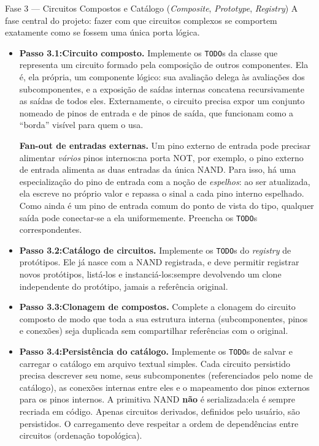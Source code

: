 \documentclass[11pt,a4paper]{article}
\begin{document}
\begin{phasebox}{Fase 3 — Circuitos Compostos e Catálogo (\textit{Composite}, \textit{Prototype}, \textit{Registry})}{}
A fase central do projeto: fazer com que circuitos complexos se comportem exatamente como se fossem uma única porta lógica.

\begin{itemize}
    \item \textbf{Passo 3.1:Circuito composto.} Implemente os \texttt{TODO}s da classe que representa um circuito formado pela composição de outros componentes. Ela é, ela própria, um componente lógico: sua avaliação delega às avaliações dos subcomponentes, e a exposição de saídas internas concatena recursivamente as saídas de todos eles. Externamente, o circuito precisa expor um conjunto nomeado de pinos de entrada e de pinos de saída, que funcionam como a ``borda'' visível para quem o usa.

    \textbf{Fan-out de entradas externas.} Um pino externo de entrada pode precisar alimentar \emph{vários} pinos internos:na porta NOT, por exemplo, o pino externo de entrada alimenta as duas entradas da única NAND. Para isso, há uma especialização do pino de entrada com a noção de \emph{espelhos}: ao ser atualizada, ela escreve no próprio valor e repassa o sinal a cada pino interno espelhado. Como ainda é um pino de entrada comum do ponto de vista do tipo, qualquer saída pode conectar-se a ela uniformemente. Preencha os \texttt{TODO}s correspondentes.
    \item \textbf{Passo 3.2:Catálogo de circuitos.} Implemente os \texttt{TODO}s do \textit{registry} de protótipos. Ele já nasce com a NAND registrada, e deve permitir registrar novos protótipos, listá-los e instanciá-los:sempre devolvendo um clone independente do protótipo, jamais a referência original.
    \item \textbf{Passo 3.3:Clonagem de compostos.} Complete a clonagem do circuito composto de modo que toda a sua estrutura interna (subcomponentes, pinos e conexões) seja duplicada sem compartilhar referências com o original.
    \item \textbf{Passo 3.4:Persistência do catálogo.} Implemente os \texttt{TODO}s de salvar e carregar o catálogo em arquivo textual simples. Cada circuito persistido precisa descrever seu nome, seus subcomponentes (referenciados pelo nome de catálogo), as conexões internas entre eles e o mapeamento dos pinos externos para os pinos internos. A primitiva NAND \textbf{não} é serializada:ela é sempre recriada em código. Apenas circuitos derivados, definidos pelo usuário, são persistidos. O carregamento deve respeitar a ordem de dependências entre circuitos (ordenação topológica).
\end{itemize}


\end{phasebox}
\end{document}
